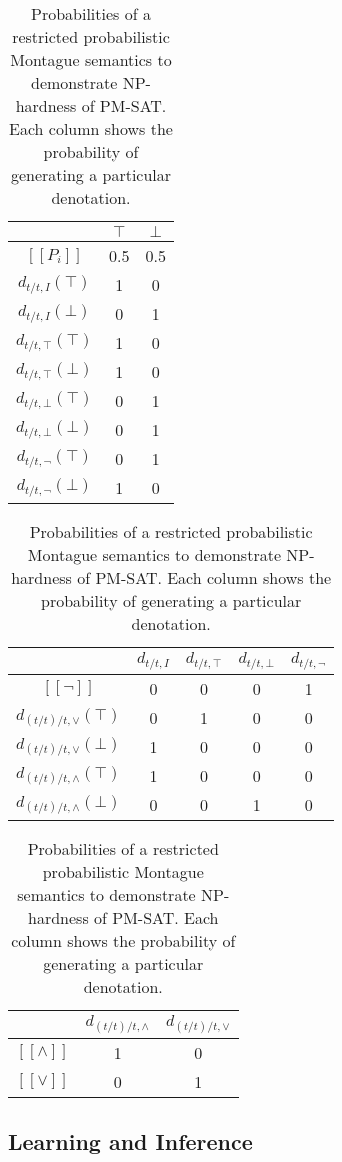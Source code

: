 \documentclass[manuscript]{clv2}
\newcommand{\interp}[1]{[\![ #1 ]\!]}
\begin{document}
\begin{table}
\hfill
\begin{tabular}{c|c|c}
 & $\top$ & $\bot$ \\
\hline
$\interp{P_i}$ & 0.5 & 0.5 \\
$d_{t/t,I}(\top)$ & 1 & 0\\
$d_{t/t,I}(\bot)$ & 0 & 1\\
$d_{t/t,\top}(\top)$ & 1 & 0\\
$d_{t/t,\top}(\bot)$ & 1 & 0\\
$d_{t/t,\bot}(\top)$ & 0 & 1\\
$d_{t/t,\bot}(\bot)$ & 0 & 1\\
$d_{t/t,\lnot}(\top)$ & 0 & 1\\
$d_{t/t,\lnot}(\bot)$ & 1 & 0
\end{tabular}\hfill
\begin{minipage}[c][4.3cm]{0.5\linewidth}
\centering
\begin{tabular}{c|c|c|c|c}
 & $d_{t/t,I}$ & $d_{t/t,\top}$ & $d_{t/t,\bot}$ & $d_{t/t,\lnot}$ \\
\hline
$\interp{\lnot}$ & 0 & 0 & 0 & 1 \\
$d_{(t/t)/t,\lor}(\top)$ & 0 & 1 & 0 & 0\\
$d_{(t/t)/t,\lor}(\bot)$ & 1 & 0 & 0 & 0\\
$d_{(t/t)/t,\land}(\top)$ & 1 & 0 & 0 & 0\\
$d_{(t/t)/t,\land}(\bot)$ & 0 & 0 & 1 & 0\\
\end{tabular}%
\vfill
\begin{tabular}{c|c|c}
 & $d_{(t/t)/t,\land}$ & $d_{(t/t)/t,\lor}$ \\
\hline
$\interp{\land}$ & 1 & 0 \\
$\interp{\lor}$ & 0 & 1 \\
\end{tabular}%
\end{minipage}%
\hspace*{\fill}
\vspace{0.2cm}
\caption{Probabilities of a restricted probabilistic Montague
  semantics to demonstrate NP-hardness of PM-SAT. Each column shows
  the probability of generating a particular denotation.}
\label{table:pmsat}
\end{table}



\subsection{Learning and Inference}
\end{document}
